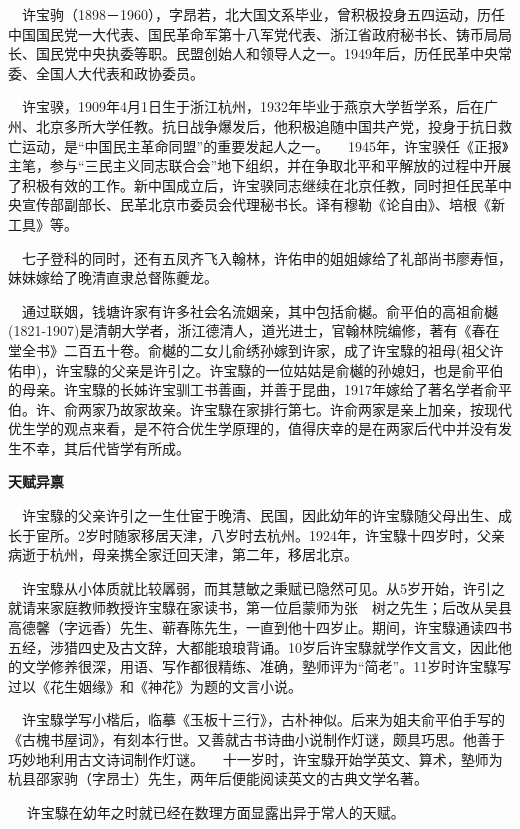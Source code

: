 \documentclass[a4paper,AutoFakeBold,oneside,12pt]{article}
\begin{document}
$\quad$许宝驹（1898－1960），字昂若，北大国文系毕业，曾积极投身五四运动，历任中国国民党一大代表、国民革命军第十八军党代表、浙江省政府秘书长、铸币局局长、国民党中央执委等职。民盟创始人和领导人之一。1949年后，历任民革中央常委、全国人大代表和政协委员。

$\quad$许宝骙，1909年4月1日生于浙江杭州，1932年毕业于燕京大学哲学系，后在广州、北京多所大学任教。抗日战争爆发后，他积极追随中国共产党，投身于抗日救亡运动，是“中国民主革命同盟”的重要发起人之一。
	$\quad$1945年，许宝骙任《正报》主笔，参与“三民主义同志联合会”地下组织，并在争取北平和平解放的过程中开展了积极有效的工作。新中国成立后，许宝骙同志继续在北京任教，同时担任民革中央宣传部副部长、民革北京市委员会代理秘书长。译有穆勒《论自由》、培根《新工具》等。

$\quad$七子登科的同时，还有五凤齐飞入翰林，许佑申的姐姐嫁给了礼部尚书廖寿恒，妹妹嫁给了晚清直隶总督陈夔龙。

$\quad$通过联姻，钱塘许家有许多社会名流姻亲，其中包括俞樾。俞平伯的高祖俞樾(1821-1907)是清朝大学者，浙江德清人，道光进士，官翰林院编修，著有《春在堂全书》二百五十卷。俞樾的二女儿俞绣孙嫁到许家，成了许宝騄的祖母(祖父许佑申)，许宝騄的父亲是许引之。许宝騄的一位姑姑是俞樾的孙媳妇，也是俞平伯的母亲。许宝騄的长姊许宝驯工书善画，并善于昆曲，1917年嫁给了著名学者俞平伯。许、俞两家乃故家故亲。许宝騄在家排行第七。许俞两家是亲上加亲，按现代优生学的观点来看，是不符合优生学原理的，值得庆幸的是在两家后代中并没有发生不幸，其后代皆学有所成。

	\textbf{天赋异禀}

$\quad$许宝騄的父亲许引之一生仕宦于晚清、民国，因此幼年的许宝騄随父母出生、成长于宦所。2岁时随家移居天津，八岁时去杭州。1924年，许宝騄十四岁时，父亲病逝于杭州，母亲携全家迁回天津，第二年，移居北京。

$\quad$许宝騄从小体质就比较羼弱，而其慧敏之秉赋已隐然可见。从5岁开始，许引之就请来家庭教师教授许宝騄在家读书，第一位启蒙师为张　树之先生；后改从吴县高德馨（字远香）先生、蕲春陈先生，一直到他十四岁止。期间，许宝騄通读四书五经，涉猎四史及古文辞，大都能琅琅背诵。10岁后许宝騄就学作文言文，因此他的文学修养很深，用语、写作都很精练、准确，塾师评为“简老”。11岁时许宝騄写过以《花生姻缘》和《神花》为题的文言小说。

$\quad$许宝騄学写小楷后，临摹《玉板十三行》，古朴神似。后来为姐夫俞平伯手写的《古槐书屋词》，有刻本行世。又善就古书诗曲小说制作灯谜，颇具巧思。他善于巧妙地利用古文诗词制作灯谜。
	$\quad$十一岁时，许宝騄开始学英文、算术，塾师为杭县邵家驹（字昂士）先生，两年后便能阅读英文的古典文学名著。

$\quad$	许宝騄在幼年之时就已经在数理方面显露出异于常人的天赋。
\end{document}
